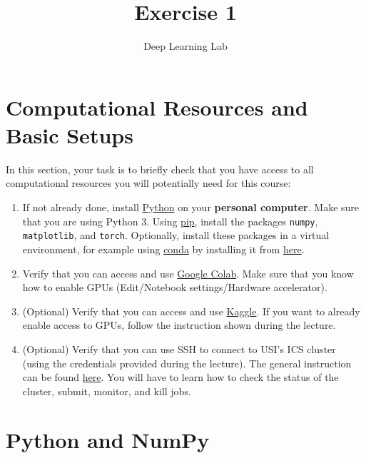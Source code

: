 \documentclass[a4paper,11pt]{article}
\title{Exercise 1}
\author{Deep Learning Lab}
\begin{document}
\maketitle

\section{Computational Resources and Basic Setups}
In this section, your task is to briefly check that you have access to all computational resources you will potentially need for this course:
\begin{enumerate}
 \item If not already done, install \href{https://www.python.org}{Python} on your \textbf{personal computer}. Make sure that you are using Python 3.
Using \href{https://packaging.python.org/tutorials/installing-packages/#use-pip-for-installing}{pip}, install the packages \texttt{numpy}, \texttt{matplotlib}, and \texttt{torch}.
Optionally, install these packages in a virtual environment, for example using
\href{https://docs.conda.io/projects/conda/en/latest/user-guide/concepts/installing-with-conda.html}{conda} by installing it from
\href{https://docs.conda.io/en/latest/miniconda.html}{here}.
\item Verify that you can access and use \href{https://colab.research.google.com}{Google Colab}.
Make sure that you know how to enable GPUs (Edit/Notebook settings/Hardware accelerator).
\item (Optional) Verify that you can access and use \href{https://www.kaggle.com/code}{Kaggle}. If you want to already enable access to GPUs, follow the instruction shown during the lecture.
 \item (Optional) Verify that you can use SSH to connect to USI's ICS cluster (using the credentials provided during the lecture).
The general instruction can be found \href{https://intranet.ics.usi.ch/HPC}{here}.
You will have to learn how to check the status of the cluster, submit, monitor, and kill jobs.
\end{enumerate}
\section{Python and NumPy}
\end{document}
